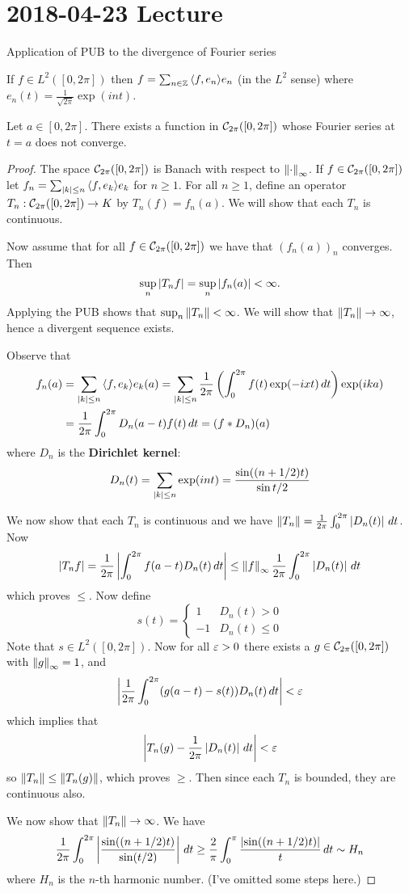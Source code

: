 \section{2018-04-23 Lecture}

Application of PUB to the divergence of Fourier series

If $f \in L^2([0,2\pi])$ then $f = \sum_{n \in \mathbb{Z}} {\left\langle f,e_n \right\rangle} e_n$ (in the $L^2$ sense) where $e_n(t) = \frac 1{\sqrt{2\pi}} \exp(int)$.

\begin{prop}
	Let $a \in [0,2\pi]$.
	There exists a function in $\mathcal{C}_{2\pi}([0,2\pi])$ whose Fourier series at $t=a$ does not converge.
\end{prop}

\begin{proof}
	The space $\mathcal{C}_{2\pi}([0,2\pi])$ is Banach with respect to $\left\lVert \cdot \right\rVert_\infty$.
	If $f \in \mathcal{C}_{2\pi}([0,2\pi])$ let $f_n = \sum_{\left\lvert k \right\rvert\leq n} {\left\langle f,e_k \right\rangle}e_k$ for $n \geq 1$.
	For all $n \geq 1$, define an operator $T_n: \mathcal{C}_{2\pi}([0,2\pi]) \to K$ by $T_n(f)= f_n(a)$.
	We will show that each $T_n$ is continuous.

	Now assume that for all $f \in \mathcal{C}_{2\pi}([0,2\pi])$ we have that $(f_n(a))_n$ converges.
	Then
	\[\sup_n \left\lvert T_nf \right\rvert = \sup_n\left\lvert f_n(a) \right\rvert < \infty.\]
	Applying the PUB shows that $\sup_n \left\lVert T_n \right\rVert<\infty$.
	We will show that $\left\lVert T_n \right\rVert \to \infty$, hence a divergent sequence exists.

	Observe that
	\begin{align*}
		f_n(a) &= \sum_{\left\lvert k \right\rvert\leq n} {\left\langle f,e_k \right\rangle}e_k(a) = \sum_{\left\lvert k \right\rvert\leq n} \frac{1}{2\pi} \left(\int_{0}^{2\pi}f(t)\exp(-ixt)\,dt\right)\exp(ika) \\
		&= \frac{1}{2\pi} \int_{0}^{2\pi} D_n(a-t) f(t) \, dt = (f*D_n)(a)
	\end{align*}
	where $D_n$ is the \textbf{Dirichlet kernel}:
	\[D_n(t) = \sum_{\left\lvert k \right\rvert\leq n} \exp(int) = \frac{\sin((n+1/2)t)}{\sin t/2}\]

	We now show that each $T_n$ is continuous and we have $\left\lVert T_n \right\rVert = \frac{1}{2\pi} \int_{0}^{2\pi} \left\lvert D_n(t) \right\rvert \, dt$.
	Now
	\[\left\lvert T_nf \right\rvert = \frac{1}{2\pi}\left\lvert \int_{0}^{2\pi}f(a-t)D_n(t)\,dt \right\rvert \leq \left\lVert f \right\rVert_\infty \frac{1}{2\pi} \int_0^{2\pi} \left\lvert D_n(t) \right\rvert \, dt\]
	which proves $\leq$.
	Now define
	\[s(t)=
	\begin{cases}
	    1 & D_n(t)>0 \\
	    -1 & D_n(t)\leq 0
	\end{cases}\]
	Note that $s \in L^2([0,2\pi])$.
	Now for all $\varepsilon>0$ there exists a $g \in \mathcal{C}_{2\pi}([0,2\pi])$ with $\left\lVert g \right\rVert_\infty=1$, and
	\[\left\lvert \frac{1}{2\pi}\int_{0}^{2\pi}(g(a-t)-s(t))D_n(t)\, dt \right\rvert<\varepsilon\]
	which implies that
	\[\left\lvert T_n(g)-\frac{1}{2\pi}\left\lvert D_n(t) \right\rvert\, dt \right\rvert<\varepsilon\]
	so $\left\lVert T_n \right\rVert \leq \left\lVert T_n(g) \right\rVert$, which proves $\geq$.
	Then since each $T_n$ is bounded, they are continuous also.

	We now show that $\left\lVert T_n \right\rVert \to \infty$.
	We have
      \[\frac{1}{2\pi}\int_{0}^{2\pi}\left\lvert \frac{\sin( (n+1/2)t)}{\sin(t/2)} \right\rvert\, dt \geq \frac{2}{\pi}\int_{0}^{\pi}\frac{\left\lvert \sin( (n+1/2)t) \right\rvert}{t}\, dt \sim H_n\]
      where $H_n$ is the $n$-th harmonic number.
      (I've omitted some steps here.)
\end{proof}
